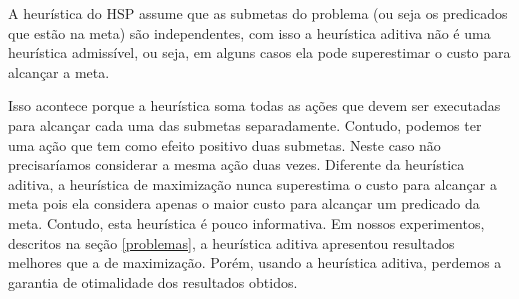 A heurística do HSP assume que as submetas do problema (ou seja os predicados que estão na meta) são independentes, com isso a heurística aditiva não é uma heurística admissível, ou seja, em alguns casos ela pode superestimar o custo para alcançar a meta. 

Isso acontece porque a heurística soma todas as ações que devem ser executadas para alcançar cada uma das submetas separadamente. Contudo, podemos ter uma ação que tem como efeito positivo duas submetas. Neste caso não precisaríamos considerar a mesma ação duas vezes. Diferente da heurística aditiva, a heurística de maximização nunca superestima o custo para alcançar a meta pois ela considera apenas o maior custo para alcançar um predicado da meta. Contudo, esta heurística é pouco informativa. Em nossos experimentos, descritos na seção \ref{problemas}, a heurística aditiva apresentou resultados melhores que a de maximização. Porém, usando a heurística aditiva, perdemos a garantia de otimalidade dos resultados obtidos.






